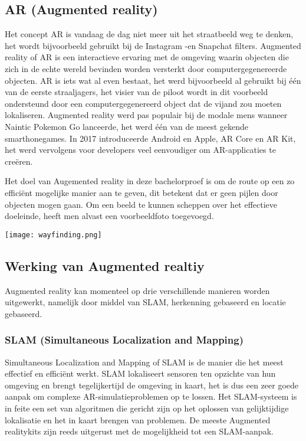 \subsection{AR (Augmented reality)}
Het concept AR is vandaag de dag niet meer uit het straatbeeld weg te denken, het wordt bijvoorbeeld gebruikt bij de Instagram -en Snapchat filters. Augmented reality of AR is een interactieve ervaring met de omgeving waarin objecten die zich in de echte wereld bevinden worden versterkt door computergegenereerde objecten. AR is iets wat al even bestaat, het werd bijvoorbeeld al gebruikt bij één van de eerste straaljagers, het visier van de piloot wordt in dit voorbeeld ondersteund door een computergegenereerd object dat de vijand zou moeten lokaliseren. Augmented reality werd pas populair bij de modale mens wanneer Naintic Pokemon Go lanceerde, het werd één van de meest gekende smarthonegames. In 2017 introduceerde Android en Apple, AR Core en AR Kit, het werd vervolgens voor developers veel eenvoudiger om AR-applicaties te creëren.

Het doel van Augemented reality in deze bachelorproef is om de route op een zo efficiënt mogelijke manier aan te geven, dit betekent dat er geen pijlen door objecten mogen gaan. Om een beeld te kunnen scheppen over het effectieve doeleinde, heeft men alvast een voorbeeldfoto toegevoegd.

\begin{center}
	\texttt{[image: wayfinding.png]}
\end{center}

\subsection{Werking van Augmented realtiy}
Augmented reality kan momenteel op drie verschillende manieren worden uitgewerkt, namelijk door middel van SLAM, herkenning gebaseerd en locatie gebaseerd.

\subsubsection{SLAM (Simultaneous Localization and Mapping)}
Simultaneous Localization and Mapping of SLAM is de manier die het meest effectief en efficiënt werkt. SLAM lokaliseert sensoren ten opzichte van hun omgeving en brengt tegelijkertijd de omgeving in kaart, het is dus een zeer goede aanpak om complexe AR-simulatieproblemen op te lossen. Het SLAM-systeem is in feite een set van algoritmen die gericht zijn op het oplossen van gelijktijdige lokalisatie en het in kaart brengen van problemen. De meeste Augmented realitykits zijn reeds uitgerust met de mogelijkheid tot een SLAM-aanpak.

